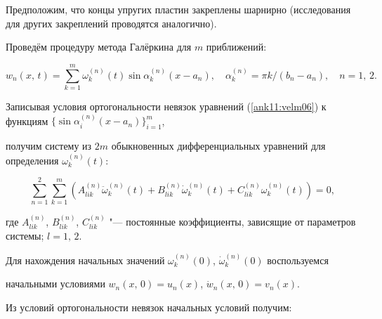 \smallskip




Предположим, что концы упругих пластин закреплены шарнирно (исследования для других закреплений проводятся аналогично). 

Проведём процедуру метода Галёркина для $m$ приближений:

\begin{equation}

w_n(x,\,t)=\sum \limits_{k=1}^m \omega_k^{(n)}(t)\sin \alpha

_k^{(n)}(x - a_n),\quad

\alpha_k^{(n)} = {\pi k}/({b_n- a_n}),\quad n = 1,\,2.

\label{koz:final}

\end{equation}



Записывая условия ортогональности невязок уравнений (\ref{ank11:velm06}) к функциям $\bigl\{ \sin \alpha_i^{(n)}

(x - a_n) \bigr\}_{i=1}^m$, 

получим систему из $2m$ обыкновенных дифференциальных уравнений для определения $\omega _k^{(n)} (t)$:

\begin{equation}

\label{ank11:velm07} \sum\limits_{n = 1}^2 \sum \limits_{k = 1}^m \left( A_{lik}^{(n)} \ddot {\omega}

_k^{(n)} (t) + B_{lik}^{(n)} \dot {\omega} _k^{(n)} (t) + C_{lik}^{(n)} \omega _k^{(n)} (t) \right) = 0,

\end{equation}

где $A_{lik}^{(n)}$, $B_{lik}^{(n)}$, $C_{lik}^{(n)}$ "--- постоянные коэффициенты, зависящие от параметров системы; $l = 1,\,2$.



Для нахождения начальных значений $\omega _k^{(n)} (0)$, $\dot

{\omega} _k^{(n)} (0)$ воспользуемся

начальными условиями $w_n (x,\,0) = u_n (x)$, $\dot {w}_n (x,\,0) = v_n (x)$. 

Из условий ортогональности невязок начальных условий получим:

